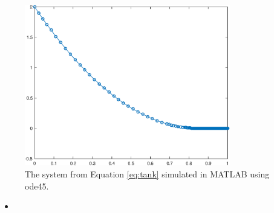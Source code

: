 \documentclass{article}
\newcommand{\matlabscript}[2]{\begin{itemize}\item[]\end{itemize}}
\begin{document}
\begin{figure}[H]
    \centering
    \includegraphics[width = 0.8\textwidth]{modsim_ex6_4c}
    \caption{The system from Equation \ref{eq:tank} simulated in MATLAB using ode45.}
    \label{fig:4c}
\end{figure}

\matlabscript{modsim_ex6_4c}{4c}
\end{document}
